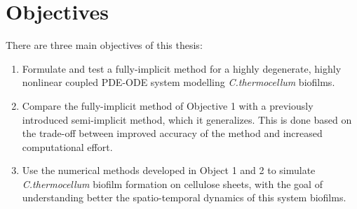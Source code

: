 \section{Objectives}

There are three main objectives of this thesis:
\begin{enumerate}
  \item Formulate and test a fully-implicit method for a highly degenerate, highly nonlinear coupled PDE-ODE system modelling \textit{C.thermocellum} biofilms. 
  \item Compare the fully-implicit method of Objective 1 with a previously introduced semi-implicit method, which it generalizes.
    This is done based on the trade-off between improved accuracy of the method and increased computational effort.
  \item Use the numerical methods developed in Object 1 and 2 to simulate \textit{C.thermocellum} biofilm formation on cellulose sheets, with the goal of understanding better the spatio-temporal dynamics of this system biofilms. 
\end{enumerate}


